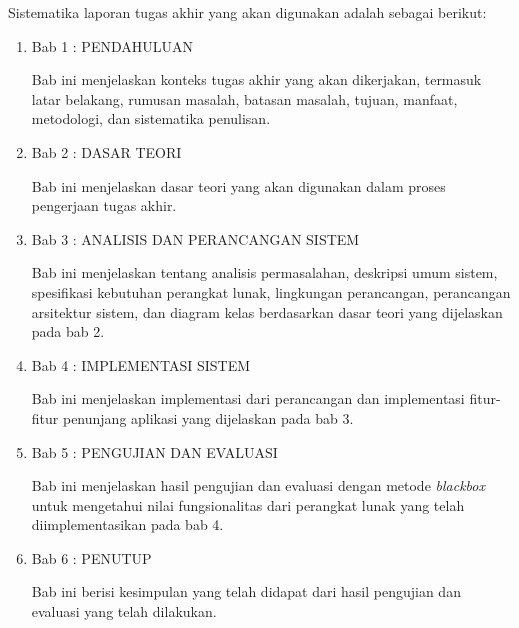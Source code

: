 Sistematika laporan tugas akhir yang akan digunakan adalah sebagai berikut:

\begin{enumerate}
\item Bab 1 : PENDAHULUAN

Bab ini menjelaskan konteks tugas akhir yang akan dikerjakan, termasuk latar belakang, rumusan masalah, batasan masalah, tujuan, manfaat, metodologi, dan sistematika penulisan.

\item Bab 2 : DASAR TEORI

Bab ini menjelaskan dasar teori yang akan digunakan dalam proses pengerjaan tugas akhir.

\item Bab 3 : ANALISIS DAN PERANCANGAN SISTEM

Bab ini menjelaskan tentang analisis permasalahan, deskripsi umum sistem, spesifikasi kebutuhan perangkat lunak, lingkungan perancangan, perancangan arsitektur sistem, dan diagram kelas berdasarkan dasar teori yang dijelaskan pada bab 2.

\item Bab 4 : IMPLEMENTASI SISTEM

Bab ini menjelaskan implementasi dari perancangan dan implementasi fitur-fitur penunjang aplikasi yang dijelaskan pada bab 3.

\item Bab 5 : PENGUJIAN DAN EVALUASI

Bab ini menjelaskan hasil pengujian dan evaluasi dengan metode \textit{blackbox} untuk mengetahui nilai fungsionalitas dari perangkat lunak yang telah diimplementasikan pada bab 4.

\item Bab 6 : PENUTUP

Bab ini berisi kesimpulan yang telah didapat dari hasil pengujian dan evaluasi yang telah dilakukan.
\end{enumerate}
